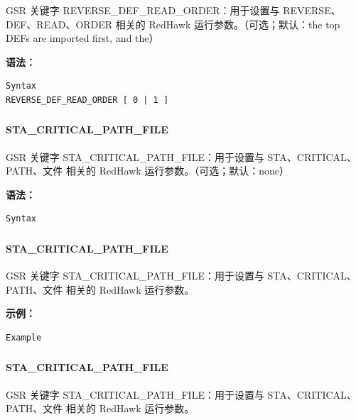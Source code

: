 GSR 关键字 REVERSE_DEF_READ_ORDER：用于设置与 REVERSE、DEF、READ、ORDER 相关的 RedHawk 运行参数。（可选；默认：the top DEFs are imported first, and the）

\textbf{语法：}
\begin{lstlisting}
Syntax
REVERSE_DEF_READ_ORDER [ 0 | 1 ]
\end{lstlisting}

\subsubsection{}
\paragraph*{STA_CRITICAL_PATH_FILE}

GSR 关键字 STA_CRITICAL_PATH_FILE：用于设置与 STA、CRITICAL、PATH、文件 相关的 RedHawk 运行参数。（可选；默认：none）

\textbf{语法：}
\begin{lstlisting}
Syntax
\end{lstlisting}

\subsubsection{}
\paragraph*{STA_CRITICAL_PATH_FILE}

GSR 关键字 STA_CRITICAL_PATH_FILE：用于设置与 STA、CRITICAL、PATH、文件 相关的 RedHawk 运行参数。

\textbf{示例：}
\begin{lstlisting}
Example
\end{lstlisting}

\subsubsection{}
\paragraph*{STA_CRITICAL_PATH_FILE}

GSR 关键字 STA_CRITICAL_PATH_FILE：用于设置与 STA、CRITICAL、PATH、文件 相关的 RedHawk 运行参数。

\subsubsection{}

